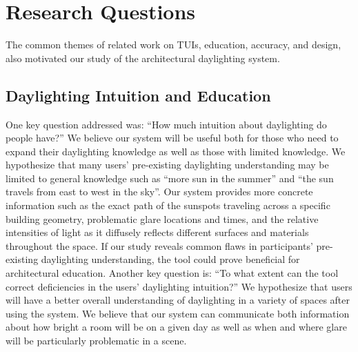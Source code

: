 \documentclass[review]{vgtc}                 %
\begin{document}
\section{Research Questions}

The common themes of related work on TUIs, education, accuracy, and
design, also motivated
our study of the architectural daylighting system.


\subsection{Daylighting Intuition and Education}

One key question addressed was: ``How much intuition about daylighting
do people have?''  We believe our system will be useful both for those
who need to expand their daylighting knowledge as well as those with
limited knowledge.  We hypothesize that many users' pre-existing
daylighting understanding may be limited to general knowledge such as
``more sun in the summer'' and ``the sun travels from east to west in
the sky''.  Our system provides more concrete information such as the
exact path of the sunspots traveling across a specific building
geometry, problematic glare locations and times, and the relative
intensities of light as it diffusely reflects different surfaces and
materials throughout the space.  If our study reveals common flaws in
participants' pre-existing daylighting understanding, the tool could
prove beneficial for architectural education.  Another key question
is: ``To what extent can the tool correct deficiencies in the users'
daylighting intuition?''  We hypothesize that users will have a better
overall understanding of daylighting in a variety of spaces after
using the system.  We believe that our system can communicate both
information about how bright a room will be on a given day as well as
when and where glare will be particularly problematic in a scene.

\end{document}
